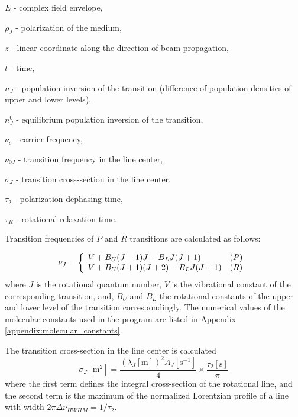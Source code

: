 \documentclass{report}
\begin{document}
$E$ - complex field envelope,

$\rho_J$ - polarization of the medium,

$z$ - linear coordinate along the direction of beam propagation,

$t$ - time,

$n_J$ - population inversion of the transition (difference of population densities of upper and lower levels),

$n_J^0$ - equilibrium population inversion of the transition,

$\nu _c$ - carrier frequency,

$\nu_{0J}$ - transition frequency in the line center,

$\sigma_J$ - transition cross-section in the line center,

$\tau_2$ - polarization dephasing time,

$\tau_R$ - rotational relaxation time.

Transition frequencies of $P$ and $R$ transitions are calculated as follows:

\begin{equation}\label{eq:frequencies}
\nu_J = \left\{ \begin{array}{ll}
  V + B_U (J-1)J     - B_L J (J+1) & (P)\\
  V + B_U (J+1)(J+2) - B_L J (J+1) & (R)\end{array}\right.\\ 
\end{equation}
where $J$ is the rotational quantum number, $V$ is the vibrational constant of the corresponding transition, and, $B_U$ and $B_L$ the rotational constants of the upper and lower level of the transition correspondingly. The numerical values of the molecular constants used in the program are listed in Appendix \ref{appendix:molecular_constants}.

The transition cross-section in the line center is calculated \cite{Hilborn-2002}
\begin{equation}\label{eq:sigma}
{\sigma _J}[\text{m}^2] = \frac{(\lambda _J[\text{m}])^2 A_J[\text{s}^{-1}]}{4} \times \frac{\tau_2[\text{s}]}{\pi}
\end{equation}
where the first term defines the integral cross-section of the rotational line, and the second term is the maximum of the normalized Lorentzian profile of a line with width $2\pi\Delta\nu _{HWHM}=1/\tau_2$.
\end{document}
